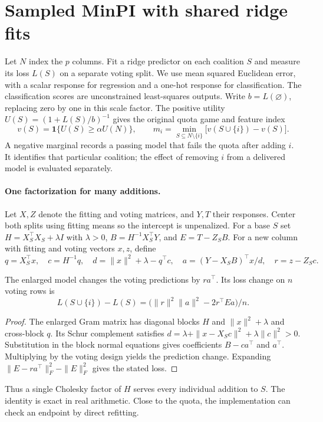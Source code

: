 \section{Sampled MinPI with shared ridge fits}
\label{sec:sampled-minpi}
Let \(N\) index the \(p\) columns. Fit a ridge predictor on each coalition \(S\)
and measure its loss \(L(S)\) on a separate voting split. We use mean squared
Euclidean error, with a scalar response for regression and a one-hot response
for classification. The classification scores are unconstrained least-squares
outputs. Write \(b=L(\varnothing)\), replacing zero by one in this scale
factor. The positive utility \(U(S)=(1+L(S)/b)^{-1}\) gives the original
quota game and feature index~\cite{shi2026minpi}
\[
 v(S)=\mathbf{1}\{U(S)\ge\alpha U(N)\},\qquad
 m_i=\min_{S\subseteq N\setminus\{i\}}\bigl[v(S\cup\{i\})-v(S)\bigr].
\]
A negative marginal records a passing model that fails the quota after adding
\(i\). It identifies that particular coalition; the effect of removing \(i\)
from a delivered model is evaluated separately.

\paragraph{One factorization for many additions.}
Let \(X,Z\) denote the fitting and voting matrices, and \(Y,T\) their responses.
Center both splits using fitting means so the intercept is unpenalized. For a base
\(S\) set \(H=X_S^\top X_S+\lambda I\) with \(\lambda>0\),
\(B=H^{-1}X_S^\top Y\), and \(E=T-Z_S B\). For a new column with fitting
and voting vectors \(x,z\), define
\[
 q=X_S^\top x,\quad c=H^{-1}q,\quad
 d=\|x\|^2+\lambda-q^\top c,\quad
 a=(Y-X_SB)^\top x/d,\quad r=z-Z_Sc .
\]
\begin{proposition}
The enlarged model changes the voting predictions by \(ra^\top\).
Its loss change on \(n\) voting rows is
\[
 L(S\cup\{i\})-L(S)=
 \bigl(\|r\|^2\|a\|^2-2r^\top E a\bigr)/n .
\]
\end{proposition}
\begin{proof}
The enlarged Gram matrix has diagonal blocks \(H\) and \(\|x\|^2+\lambda\)
and cross-block \(q\). Its Schur complement satisfies
\(d=\lambda+\|x-X_Sc\|^2+\lambda\|c\|^2>0\). Substitution in the block
normal equations gives coefficients \(B-ca^\top\) and \(a^\top\).
Multiplying by the voting design yields the prediction change. Expanding
\(\|E-ra^\top\|_F^2-\|E\|_F^2\) gives the stated loss.
\end{proof}
Thus a single Cholesky factor of \(H\) serves every individual addition to \(S\).
The identity is exact in real arithmetic. Close to the quota, the implementation
can check an endpoint by direct refitting.

